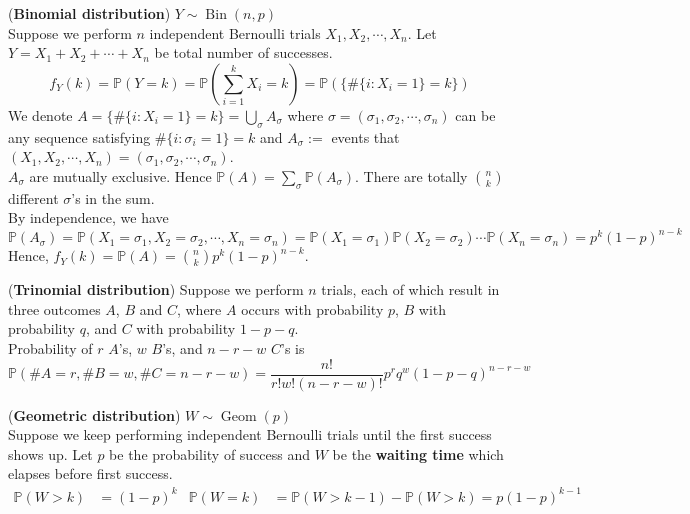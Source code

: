 \documentclass{huhtakm-template-book}
\newcommand{\prob}{\mathbb{P}}
\DeclareMathOperator{\Bin}{Bin}
\DeclareMathOperator{\Geom}{Geom}
\begin{document}
    \begin{eg}(\textbf{Binomial distribution}) $Y\sim\Bin(n,p)$\\
        Suppose we perform $n$ independent Bernoulli trials $X_{1},X_{2},\cdots,X_{n}$. Let $Y=X_{1}+X_{2}+\cdots+X_{n}$ be total number of successes.
        \begin{equation*}
            f_{Y}(k)=\prob(Y=k)=\prob\left(\sum_{i=1}^{k}X_{i}=k\right)=\prob(\{\#\{i:X_{i}=1\}=k\})
        \end{equation*}
        We denote $A=\{\#\{i:X_{i}=1\}=k\}=\bigcup_{\sigma}A_{\sigma}$ where $\sigma=(\sigma_{1},\sigma_{2},\cdots,\sigma_{n})$ can be any sequence satisfying $\#\{i:\sigma_{i}=1\}=k$ and $A_{\sigma}:=$ events that $(X_{1},X_{2},\cdots,X_{n})=(\sigma_{1},\sigma_{2},\cdots,\sigma_{n})$.\\
        $A_{\sigma}$ are mutually exclusive. Hence $\prob(A)=\sum_{\sigma}\prob(A_{\sigma})$. There are totally $\binom{n}{k}$ different $\sigma$'s in the sum.\\
        By independence, we have
        \begin{equation*}
            \prob(A_{\sigma})=\prob(X_{1}=\sigma_{1},X_{2}=\sigma_{2},\cdots,X_{n}=\sigma_{n})=\prob(X_{1}=\sigma_{1})\prob(X_{2}=\sigma_{2})\cdots\prob(X_{n}=\sigma_{n})=p^{k}(1-p)^{n-k}
        \end{equation*}
        Hence, $f_{Y}(k)=\prob(A)=\binom{n}{k}p^{k}(1-p)^{n-k}$.
    \end{eg}
    \begin{eg}(\textbf{Trinomial distribution})
        Suppose we perform $n$ trials, each of which result in three outcomes $A$, $B$ and $C$, where $A$ occurs with probability $p$, $B$ with probability $q$, and $C$ with probability $1-p-q$.\\
        Probability of $r$ $A$'s, $w$ $B$'s, and $n-r-w$ $C$'s is
        \begin{equation*}
            \prob(\#A=r, \#B=w, \#C=n-r-w)=\frac{n!}{r!w!(n-r-w)!}p^{r}q^{w}(1-p-q)^{n-r-w}
        \end{equation*}
    \end{eg}
    \begin{eg}(\textbf{Geometric distribution}) $W\sim\Geom(p)$\\
        Suppose we keep performing independent Bernoulli trials until the first success shows up. Let $p$ be the probability of success and $W$ be the \textbf{waiting time} which elapses before first success.
        \begin{align*}
            \prob(W>k)&=(1-p)^{k} & \prob(W=k)&=\prob(W>k-1)-\prob(W>k)=p(1-p)^{k-1}
        \end{align*}
    \end{eg}
\end{document}
